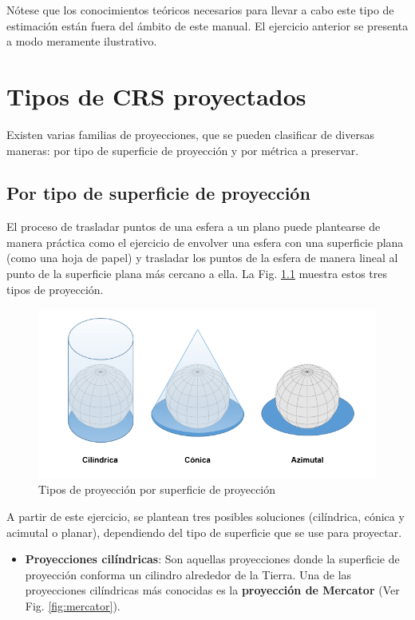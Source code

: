 \documentclass[
]{book}
\providecommand{\tightlist}{%
  \setlength{\itemsep}{0pt}\setlength{\parskip}{0pt}}
\theoremstyle{definition}
\theoremstyle{definition}
\theoremstyle{definition}
\theoremstyle{definition}
\theoremstyle{remark}
\begin{document}
Nótese que los conocimientos teóricos necesarios para llevar a cabo este tipo de
estimación están fuera del ámbito de este manual. El ejercicio anterior se
presenta a modo meramente ilustrativo.

\hypertarget{appendix-anexo}{%
\appendix}


\hypertarget{crsproy}{%
\chapter{Tipos de CRS proyectados}\label{crsproy}}

Existen varias familias de proyecciones, que se pueden clasificar de diversas
maneras: por tipo de superficie de proyección y por métrica a preservar.

\hypertarget{por-tipo-de-superficie-de-proyecciuxf3n}{%
\section{Por tipo de superficie de proyección}\label{por-tipo-de-superficie-de-proyecciuxf3n}}

El proceso de trasladar puntos de una esfera a un plano puede plantearse de
manera práctica como el ejercicio de envolver una esfera con una superficie
plana (como una hoja de papel) y trasladar los puntos de la esfera de manera
lineal al punto de la superficie plana más cercano a ella. La Fig.
\ref{fig:fi-proys} muestra estos tres tipos de proyección.

\begin{figure}

{\centering \includegraphics[width=0.6\linewidth]{img/tipos_proy} 

}

\caption{Tipos de proyección por superficie de proyección}\label{fig:fi-proys}
\end{figure}

A partir de este ejercicio, se plantean tres posibles soluciones (cilíndrica,
cónica y acimutal o planar), dependiendo del tipo de superficie que se use para
proyectar.

\begin{itemize}
\tightlist
\item
  \textbf{Proyecciones cilíndricas}: Son aquellas proyecciones donde la superficie
  de proyección conforma un cilindro alrededor de la Tierra. Una de las
  proyecciones cilíndricas más conocidas es la \textbf{proyección de Mercator} (Ver
  Fig. \ref{fig:mercator}).
\end{itemize}
\end{document}
